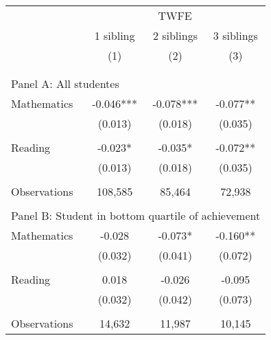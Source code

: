 \makeatletter
{}
{
\makeatother
\begin{tabular}{lccc}
\toprule
\cmidrule(lr){2-4}
& \multicolumn{3}{c}{TWFE} \\
\cmidrule(lr){2-4}
& 1 sibling & 2 siblings & 3 siblings  \\
\cmidrule(lr){2-2} \cmidrule(lr){3-3} \cmidrule(lr){4-4}
& (1) & (2) & (3)\\
\bottomrule
&  &  &  \\
&  &  &   \\
\multicolumn{4}{l}{Panel A: All studentes } \\
\hspace{3mm}Mathematics&      -0.046***&      -0.078***&      -0.077** \\
                    &     (0.013)   &     (0.018)   &     (0.035)   \\
 
&  &  &   \\
\hspace{3mm}Reading &      -0.023*  &      -0.035*  &      -0.072** \\
                    &     (0.013)   &     (0.018)   &     (0.035)   \\
                    &               &               &               \\
\hspace{3mm}Observations&     108,585   &      85,464   &      72,938   \\
 
&  &  &   \\
\multicolumn{4}{l}{Panel B: Student in bottom quartile of achievement} \\
\hspace{3mm}Mathematics&      -0.028   &      -0.073*  &      -0.160** \\
                    &     (0.032)   &     (0.041)   &     (0.072)   \\
 
&  &  &   \\
\hspace{3mm}Reading &       0.018   &      -0.026   &      -0.095   \\
                    &     (0.032)   &     (0.042)   &     (0.073)   \\
                    &               &               &               \\
\hspace{3mm}Observations&      14,632   &      11,987   &      10,145   \\
 

\end{tabular}}
